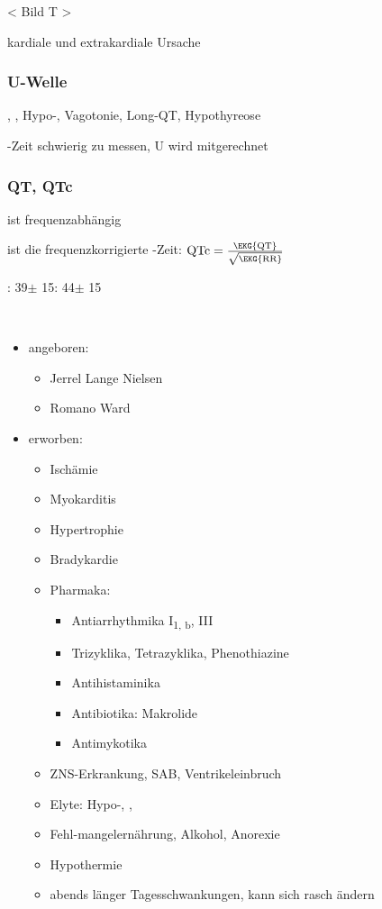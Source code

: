 < Bild T >

kardiale und extrakardiale Ursache

\subsubsection{U-Welle}

, ,   Hypo-, Vagotonie, Long-QT, Hypothyreose

-Zeit schwierig zu messen, U wird  mitgerechnet

\subsubsection{QT, QTc}

 ist frequenzabhängig

 ist die frequenzkorrigierte -Zeit: 
$\text{\text{QTc}} = \frac{\text{\EKG{QT}}}{\sqrt{\text{\EKG{RR}}}}$

\Male : 39\MS* $\pm$ 15\PC*
\Female : 44\MS* $\pm$ 15\PC*


\, 
\begin{itemize}
  \item angeboren:
  \begin{itemize}
    \item Jerrel Lange Nielsen
    \item Romano Ward
  \end{itemize}
  \item erworben:
  \begin{itemize}
    \item Ischämie
    \item Myokarditis
    \item Hypertrophie
    \item Bradykardie
    \item Pharmaka:
    \begin{itemize}
      \item Antiarrhythmika I\textsubscript{1, b}, III
      \item Trizyklika, Tetrazyklika, Phenothiazine
      \item Antihistaminika
      \item Antibiotika: Makrolide
      \item Antimykotika
    \end{itemize}
    \item ZNS-Erkrankung, SAB, Ventrikeleinbruch
    \item Elyte: Hypo-, , 
    \item Fehl-mangelernährung, Alkohol, Anorexie
    \item Hypothermie
    \item abends länger  Tagesschwankungen, kann sich rasch ändern
  \end{itemize}
\end{itemize}

